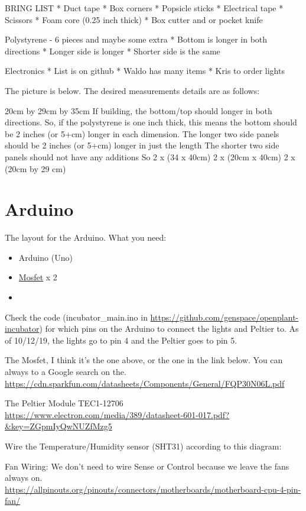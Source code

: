 \documentclass[]{book}
\begin{document}
BRING LIST
* Duct tape
* Box corners
* Popsicle sticks
* Electrical tape
* Scissors
* Foam core (0.25 inch thick)
* Box cutter and or pocket knife

Polystyrene - 6 pieces and maybe some extra
* Bottom is longer in both directions
* Longer side is longer
* Shorter side is the same

Electronics
* List is on github
* Waldo has many items
* Kris to order lights

The picture is below. The desired measurements details are as follows:

20cm by 29cm by 35cm
If building, the bottom/top should longer in both directions. So, if the polystyrene is one inch thick, this means the bottom should be 2 inches (or 5+cm) longer in each dimension.
The longer two side panels should be 2 inches (or 5+cm) longer in just the length
The shorter two side panels should not have any additions
So
2 x (34 x 40cm)
2 x (20cm x 40cm)
2 x (20cm by 29 cm)

\hypertarget{arduino}{%
\chapter{Arduino}\label{arduino}}

The layout for the Arduino. What you need:

\begin{itemize}
\item
  Arduino (Uno)
\item
  \href{https://cdn.sparkfun.com/datasheets/Components/General/FQP30N06L.pdf}{Mosfet} x 2
\item
\end{itemize}

Check the code (incubator\_main.ino in \url{https://github.com/genspace/openplant-incubator}) for which pins on the Arduino to connect the lights and Peltier to. As of 10/12/19, the lights go to pin 4 and the Peltier goes to pin 5.

The Mosfet, I think it's the one above, or the one in the link below. You can always to a Google search on the.
\url{https://cdn.sparkfun.com/datasheets/Components/General/FQP30N06L.pdf}

The Peltier Module TEC1-12706
\url{https://www.electron.com/media/389/datasheet-601-017.pdf?\&key=ZGpmIyQwNUZfMzg5}

Wire the Temperature/Humidity sensor (SHT31) according to this diagram:

Fan Wiring:
We don't need to wire Sense or Control because we leave the fans always on.
\url{https://allpinouts.org/pinouts/connectors/motherboards/motherboard-cpu-4-pin-fan/}
\end{document}
